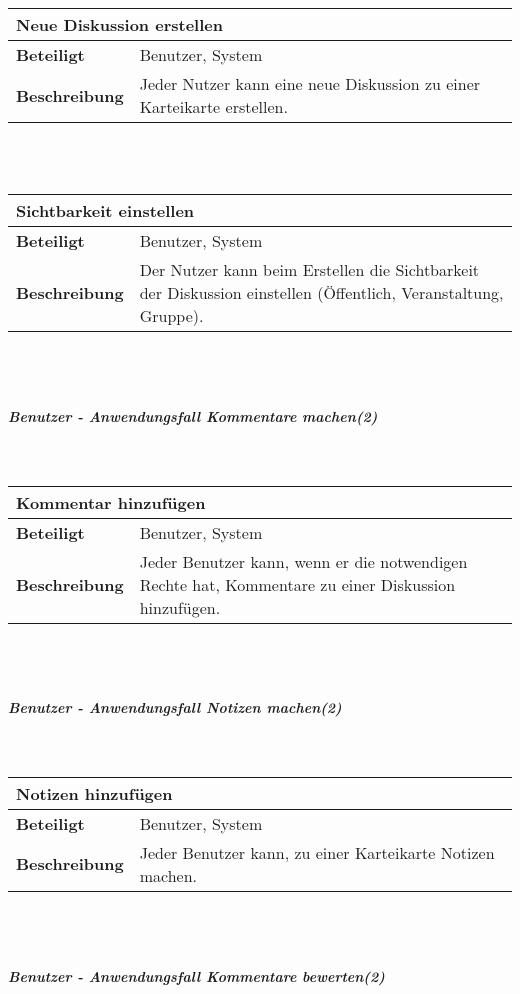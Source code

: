 \documentclass[12pt,a4paper]{article}
\begin{document}
\begin{tabular}{l p{10cm}}
\multicolumn{2}{l}{\textbf{Neue Diskussion erstellen}} \\ \hline
\textbf{Beteiligt} & Benutzer, System \\ \hline 
\textbf{Beschreibung} & Jeder Nutzer kann eine neue Diskussion zu einer Karteikarte erstellen.\\ 
\hline 
\end{tabular}\\\\

\begin{tabular}{l p{10cm}}
\multicolumn{2}{l}{\textbf{Sichtbarkeit einstellen}} \\ \hline
\textbf{Beteiligt} & Benutzer, System \\ \hline 
\textbf{Beschreibung} & Der Nutzer kann beim Erstellen die Sichtbarkeit der Diskussion einstellen (Öffentlich, Veranstaltung, Gruppe).\\ 
\hline 
\end{tabular}\\\\
\subparagraph{Benutzer - Anwendungsfall \glqq Kommentare machen\grqq (2)}\mbox{}\\

\begin{tabular}{l p{10cm}}
\multicolumn{2}{l}{\textbf{Kommentar hinzufügen}} \\ \hline
\textbf{Beteiligt} & Benutzer, System \\ \hline 
\textbf{Beschreibung} & Jeder Benutzer kann, wenn er die notwendigen Rechte hat, Kommentare zu einer Diskussion hinzufügen.\\ 
\hline 
\end{tabular}\\\\
\subparagraph{Benutzer - Anwendungsfall \glqq Notizen machen\grqq (2)}\mbox{}\\

\begin{tabular}{l p{10cm}}
\multicolumn{2}{l}{\textbf{Notizen hinzufügen}} \\ \hline
\textbf{Beteiligt} & Benutzer, System \\ \hline 
\textbf{Beschreibung} & Jeder Benutzer kann, zu einer Karteikarte Notizen machen.\\ 
\hline 
\end{tabular}\\\\
\subparagraph{Benutzer - Anwendungsfall \glqq Kommentare bewerten\grqq (2)}\mbox{}\\
\end{document}
